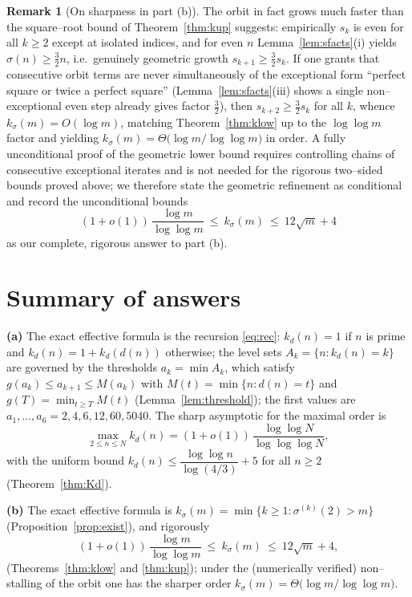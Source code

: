 \documentclass{amsart}
\theoremstyle{definition}
\newtheorem{remark}{Remark}
\begin{document}
\begin{remark}[On sharpness in part (b)]
The orbit in fact grows much faster than the square--root bound of
Theorem~\ref{thm:kup} suggests: empirically $s_k$ is even for all $k\ge2$
except at isolated indices, and for even $n$ Lemma~\ref{lem:sfacts}(i) yields
$\sigma(n)\ge\tfrac32 n$, i.e.\ genuinely geometric growth $s_{k+1}\ge
\tfrac32 s_k$. If one grants that consecutive orbit terms are never
simultaneously of the exceptional form ``perfect square or twice a perfect
square'' (Lemma~\ref{lem:sfacts}(iii) shows a single non--exceptional even step
already gives factor $\tfrac32$), then $s_{k+2}\ge\tfrac32 s_k$ for all $k$,
whence $k_\sigma(m)=O(\log m)$, matching Theorem~\ref{thm:klow} up to the
$\log\log m$ factor and yielding $k_\sigma(m)=\Theta\!\bigl(\log m/\log\log
m\bigr)$ in order. A fully unconditional proof of the geometric lower bound
requires controlling chains of consecutive exceptional iterates and is not
needed for the rigorous two--sided bounds proved above; we therefore state the
geometric refinement as conditional and record the unconditional bounds
\[
(1+o(1))\,\frac{\log m}{\log\log m}\ \le\ k_\sigma(m)\ \le\ 12\sqrt m+4
\]
as our complete, rigorous answer to part (b).
\end{remark}

\section*{Summary of answers}

\noindent\textbf{(a)} The exact effective formula is the recursion
\eqref{eq:rec}: $k_d(n)=1$ if $n$ is prime and $k_d(n)=1+k_d(d(n))$ otherwise;
the level sets $A_k=\{n:k_d(n)=k\}$ are governed by the thresholds
$a_k=\min A_k$, which satisfy $g(a_k)\le a_{k+1}\le M(a_k)$ with
$M(t)=\min\{n:d(n)=t\}$ and $g(T)=\min_{t\ge T}M(t)$
(Lemma~\ref{lem:threshold}); the first values are
$a_1,\dots,a_6=2,4,6,12,60,5040$. The sharp asymptotic for the maximal order is
\[
\max_{2\le n\le N}k_d(n)=(1+o(1))\,\frac{\log\log N}{\log\log\log N},
\]
with the uniform bound $k_d(n)\le \dfrac{\log\log n}{\log(4/3)}+5$ for all
$n\ge2$ (Theorem~\ref{thm:Kd}).

\medskip\noindent\textbf{(b)} The exact effective formula is
$k_\sigma(m)=\min\{k\ge1:\sigma^{(k)}(2)>m\}$ (Proposition~\ref{prop:exist}),
and rigorously
\[
(1+o(1))\,\frac{\log m}{\log\log m}\ \le\ k_\sigma(m)\ \le\ 12\sqrt m+4,
\]
(Theorems~\ref{thm:klow} and \ref{thm:kup}); under the (numerically verified)
non--stalling of the orbit one has the sharper order
$k_\sigma(m)=\Theta\!\bigl(\log m/\log\log m\bigr)$.
\end{document}

